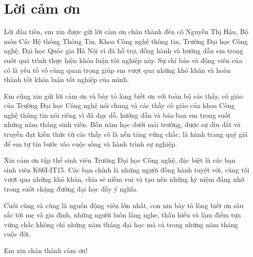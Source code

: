 \clearpage
{}

\chapter*{Lời cảm ơn}

Lời đầu tiên, em xin được gửi lời cảm ơn chân thành đến cô Nguyễn Thị Hậu, Bộ môn Các Hệ thống Thông Tin, Khoa Công nghệ thông tin, Trường Đại học Công nghệ, Đại học Quốc gia Hà Nội vì đã hỗ trợ, đồng hành và hướng dẫn em trong suốt quá trình thực hiện khóa luận tốt nghiệp này. Sự chỉ bảo và động viên của cô là yếu tố vô cùng quan trọng giúp em vượt qua những khó khăn và hoàn thành tốt khóa luận tốt nghiệp của mình.

\vspace{0.3cm}

Em cũng xin gửi lời cảm ơn và bày tỏ lòng biết ơn với toàn bộ các thầy, cô giáo của Trường Đại học Công nghệ nói chung và các thầy cô giáo của khoa Công nghệ thông tin nói riêng vì đã dạy dỗ, hướng dẫn và bảo ban em trong suốt những năm tháng sinh viên. Bốn năm học dưới mái trường, được sự dìu dắt và truyền đạt kiến thức từ các thầy cô là nền tảng vững chắc, là hành trang quý giá để em tự tin bước vào cuộc sống và hành trình sự nghiệp.

\vspace{0.3cm}

Xin cảm ơn tập thể sinh viên Trường Đại học Công nghệ, đặc biệt là các bạn sinh viên K66I-IT15. Các bạn chính là những người đồng hành tuyệt vời, cùng tôi vượt qua những khó khăn, chia sẻ niềm vui và tạo nên những kỷ niệm đáng nhớ trong suốt chặng đường đại học đầy ý nghĩa.

\vspace{0.3cm}

Cuối cùng và cũng là nguồn động viên lớn nhất, con xin bày tỏ lòng biết ơn sâu sắc tới mẹ và gia đình, những người luôn lắng nghe, thấu hiểu và làm điểm tựa vững chắc không chỉ những năm tháng đại học mà cả trong những năm tháng cuộc đời.

\vspace{0.3cm}

Em xin chân thành cảm ơn!

